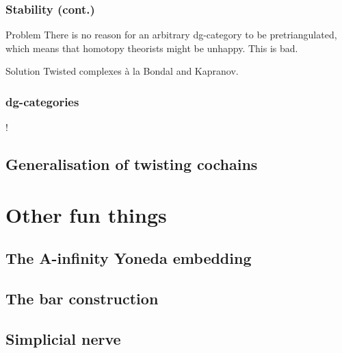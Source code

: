 \documentclass{beamer}
\begin{document}
            \begin{frame}\frametitle{Stability (cont.)}
                \begin{alertblock}{Problem}
                    There is no reason for an arbitrary dg-category to be pretriangulated, which means that homotopy theorists might be unhappy.
                    This is bad.
                \end{alertblock}

                \pause

                \begin{block}{Solution}
                    Twisted complexes à la Bondal and Kapranov.
                \end{block}
            \end{frame}

            \begin{frame}\frametitle{dg-categories}
                \begin{definition}
                    !
                \end{definition}
            \end{frame}
        
        \subsection{Generalisation of twisting cochains}
    

    \section{Other fun things}

        \subsection{The A-infinity Yoneda embedding}
        
        \subsection{The bar construction}
        
        \subsection{Simplicial nerve}
\end{document}
